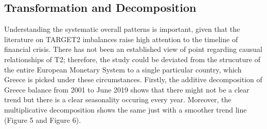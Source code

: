 \documentclass[12pt]{article}
\begin{document}
\subsection{Transformation and Decomposition}
Understanding the systematic overall patterns is important, given that the literature on TARGET2 imbalances raise high attention to the timeline of financial crisis. There has not been an established view of point regarding causual relationships of T2; therefore, the study could be deviated from the strucuture of the entire European Monetary System to a single particular country, which Greece is picked under these circumstances. Firstly, the additive decomposition of Greece balance from 2001 to June 2019 shows that there might not be a clear trend but there is a clear seasonality occuring every year. Moreover, the multiplicative decomposition shows the same just with a smoother trend line (Figure 5 and Figure 6). 
\end{document}
